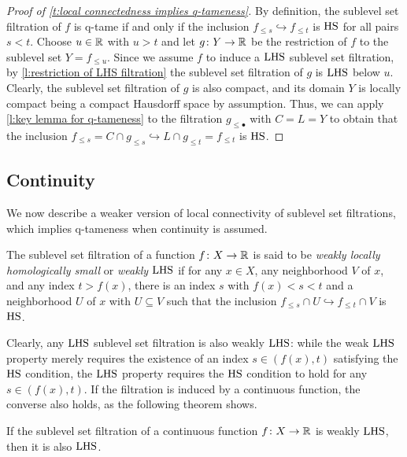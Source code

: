 \begin{proof}[Proof of \cref{t:local connectedness implies q-tameness}]
	By definition, the sublevel set filtration of $f$ is q-tame if and only if the inclusion $f_{\leq s} \hookrightarrow f_{\leq t}$ is $\mathrm{HS}$ for all pairs $s < t$.
	Choose $u \in \mathbb{R}$ with $u > t$ and let $g \colon Y \to \mathbb{R}$ be the restriction of $f$ to the sublevel set $Y=f_{\leq u}$.
	Since we assume $f$ to induce a $\mathrm{LHS}$ sublevel set filtration, by \cref{l:restriction of LHS filtration} the sublevel set filtration of $g$ is $\mathrm{LHS}$ below $u$.
	Clearly, the sublevel set filtration of $g$ is also compact, and its domain $Y$ is locally compact being a compact Hausdorff space by assumption.
	Thus, we can apply \cref{l:key lemma for q-tameness} to the filtration $g_{\leq \bullet}$ with $C = L = Y$ to obtain that the inclusion $f_{\leq s} = C \cap g_{\leq s} \hookrightarrow L \cap g_{\leq t} = f_{\leq t}$ is $\mathrm{HS}$.
\end{proof}

\subsection{Continuity}

We now describe a weaker version of local connectivity of sublevel set filtrations, which implies q-tameness when continuity is assumed.

\begin{defi}
	The sublevel set filtration of a function $f \colon X \to \mathbb{R}$ is said to be \emph{weakly locally homologically small} or \emph{weakly $\mathrm{LHS}$} if for any $x \in X$, any neighborhood $V$ of $x$, and any index $t > f(x)$, there is an index $s$ with $f(x) < s < t$ and a neighborhood $U$ of $x$ with $U \subseteq V$ such that the inclusion $f_{\leq s} \cap U \hookrightarrow f_{\leq t} \cap V$ is $\mathrm{HS}$.
\end{defi}

Clearly, any $\mathrm{LHS}$ sublevel set filtration is also weakly $\mathrm{LHS}$:
while the weak $\mathrm{LHS}$ property merely requires the existence of an index $s \in (f(x),t)$ satisfying the $\mathrm{HS}$ condition, the $\mathrm{LHS}$ property requires the $\mathrm{HS}$ condition to hold for any $s \in (f(x),t)$.
If the filtration is induced by a continuous function, the converse also holds, as the following theorem shows.

\begin{lem} \label{l:weak hlc to hlc}
	If the sublevel set filtration of a continuous function $f \colon X \to \mathbb{R}$ is weakly $\mathrm{LHS}$, then it is also $\mathrm{LHS}$.
\end{lem}


